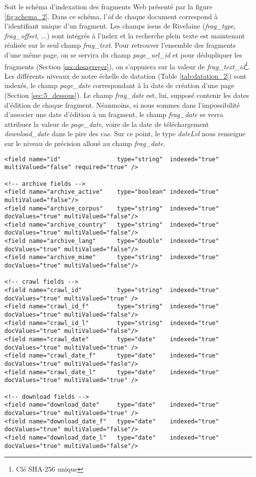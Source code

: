\documentclass[symmetric,justified,marginals=raggedouter]{tufte-book}
\begin{document}
Soit le schéma d'indexation des fragments Web présenté par la figure \ref{fig:schema_2}. Dans ce schéma, l'\textit{id} de chaque document correspond à l'identifiant unique d'un fragment. Les champs issus de Rivelaine (\textit{frag\_type}, \textit{frag\_offset}, ...) sont intégrés à l'index et la recherche plein texte est maintenant réalisée sur le seul champ \textit{frag\_text}. Pour retrouver l'ensemble des fragments d'une même page, on se servira du champ \textit{page\_url\_id} et pour dédupliquer les fragments (Section \ref{sec:desagreger}), on s'appuiera sur la valeur de \textit{frag\_text\_id}\footnote{Clé SHA-256 unique}. Les différents niveaux de notre échelle de datation (Table \ref{tab:datation_2}) sont indexés, le champ \textit{page\_date} correspondant à la date de création d'une page (Section \ref{sec:5_dessous}). Le champ \textit{frag\_date} est, lui, supposé contenir les dates d'édition de chaque fragment. Néanmoins, si nous sommes dans l'impossibilité d'associer une date d'édition à un fragment, le champ \textit{frag\_date} se verra attribuer la valeur de \textit{page\_date}, voire de la date de téléchargement \textit{download\_date} dans le pire des cas. Sur ce point, le type \textit{dateLvl} nous renseigne sur le niveau de précision alloué au champ \textit{frag\_date}.

\begin{figure*}
\small
\begin{verbatim}
<field name="id"                type="string"  indexed="true"    multiValued="false" required="true" />

<!-- archive fields -->
<field name="archive_active"    type="boolean" indexed="true"    multiValued="false"/>
<field name="archive_corpus"    type="string"  indexed="true"    docValues="true" multiValued="false"/>
<field name="archive_country"   type="string"  indexed="true"    docValues="true" multiValued="false"/>
<field name="archive_lang"      type="double"  indexed="true"    docValues="true" multiValued="false"/>
<field name="archive_mime"      type="string"  indexed="true"    docValues="true" multiValued="false"/>  

<!-- crawl fields -->
<field name="crawl_id"          type="string"  indexed="true"    docValues="true" multiValued="true" />
<field name="crawl_id_f"        type="string"  indexed="true"    docValues="true" multiValued="false"/>
<field name="crawl_id_l"        type="string"  indexed="true"    docValues="true" multiValued="false"/>
<field name="crawl_date"        type="date"    indexed="true"    docValues="true" multiValued="true" />
<field name="crawl_date_f"      type="date"    indexed="true"    docValues="true" multiValued="fasle"/>
<field name="crawl_date_l"      type="date"    indexed="true"    docValues="true" multiValued="true" />

<!-- download fields -->
<field name="download_date"     type="date"    indexed="true"    docValues="true" multiValued="true" />
<field name="download_date_f"   type="date"    indexed="true"    docValues="true" multiValued="false"/>
<field name="download_date_l"   type="date"    indexed="true"    docValues="true" multiValued="false"/> 
\end{verbatim} 
\end{figure*}
\end{document}
